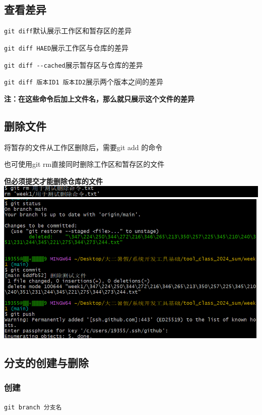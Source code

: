 \documentclass[UTF8]{ctexart}
\begin{document}
\subsection{查看差异}
\verb|git diff|\quad 默认展示工作区和暂存区的差异\par
\verb|git diff HAED|\quad 展示工作区与仓库的差异\par
\verb|git diff --cached|\quad 展示暂存区与仓库的差异\par
\verb|git diff 版本ID1 版本ID2|\quad 展示两个版本之间的差异\par
\textbf{注：在这些命令后加上文件名，那么就只展示这个文件的差异}

\subsection{删除文件}
将暂存的文件从工作区删除后，需要git add 的命令\par
也可使用git rm直接同时删除工作区和暂存区的文件\par
\textbf{但必须提交才能删除仓库的文件}\\
\includegraphics[width=1\textwidth]{rm1.png}\\
\includegraphics[width=1\textwidth]{rm2.png}

\subsection{分支的创建与删除}
\subsubsection{创建}
\verb|git branch 分支名|\par
\end{document}
